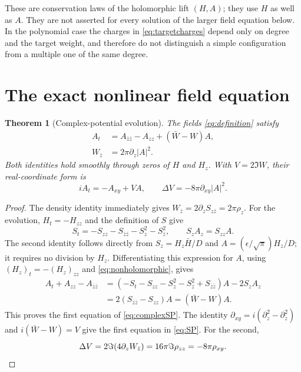 \documentclass[11pt]{article}
\newcommand{\eps}{\epsilon}
\newtheorem{theorem}{Theorem}[section]
\theoremstyle{definition}
\theoremstyle{remark}
\begin{document}
These are conservation laws of the holomorphic lift $(H,A)$; they use
$H$ as well as $A$. They are not asserted for every solution of the
larger field equation below. In the polynomial case the charges in
\eqref{eq:targetcharges} depend only on degree and the target weight,
and therefore do not distinguish a simple configuration from a
multiple one of the same degree.

\section{The exact nonlinear field equation}
\label{sec:evolution}

\begin{theorem}[Complex-potential evolution]
\label{thm:evolution}
The fields \eqref{eq:definition} satisfy
\begin{equation}
 \boxed{\begin{aligned}
 A_t&=A_{\bar z\bar z}-A_{zz}+(\bar W-W)A,\\
 W_{\bar z}&=2\pi\partial_z|A|^2.
 \end{aligned}}
 \label{eq:complexSP}
\end{equation}
Both identities hold smoothly through zeros of $H$ and $H_z$.
With $V=2\Im W$, their real-coordinate form is
\begin{equation}
 iA_t=-A_{xy}+VA,\qquad
 \Delta V=-8\pi\partial_{xy}|A|^2.
 \label{eq:SP}
\end{equation}
\end{theorem}
\begin{proof}
The density identity immediately gives
$W_{\bar z}=2\partial_zS_{z\bar z}=2\pi\rho_z$.
For the evolution, $H_t=-H_{zz}$ and the definition of $S$ give
\begin{equation}
 S_t=-S_{zz}-S_{\bar z\bar z}-S_z^2-S_{\bar z}^2,
 \qquad S_zA_z=S_{zz}A.
 \label{eq:potentialidentities}
\end{equation}
The second identity follows directly from
$S_z=H_z\bar H/D$ and $A=(\eps/\sqrt\pi)H_z/D$;
it requires no division by $H_z$.
Differentiating this expression for $A$, using
$(H_z)_t=-(H_z)_{zz}$ and \eqref{eq:nonholomorphic}, gives
\begin{align*}
 A_t+A_{zz}-A_{\bar z\bar z}
 &=(-S_t-S_{zz}-S_z^2-S_{\bar z}^2+S_{\bar z\bar z})A
   -2S_zA_z\\
 &=2(S_{\bar z\bar z}-S_{zz})A=(\bar W-W)A.
\end{align*}
This proves the first equation of \eqref{eq:complexSP}.
The identity $\partial_{xy}=i(\partial_z^2-\partial_{\bar z}^2)$
and $i(\bar W-W)=V$ give the first equation in \eqref{eq:SP}.
For the second,
\[
 \Delta V=2\Im(4\partial_zW_{\bar z})
 =16\pi\Im\rho_{zz}=-8\pi\rho_{xy}.\qedhere
\]
\end{proof}
\end{document}
